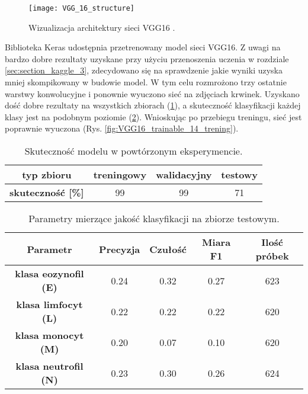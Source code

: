 \begin{figure}[h]
	\centering
	\centering
		\texttt{[image: VGG\_16\_structure]}	
	\caption{Wizualizacja architektury sieci VGG16 \cite{VGG_16_structure}.}
	\label{fig:vgg_16_stucture}
	\label{fig:ann_visualisation}
\end{figure}

{\parindent0pt
Biblioteka Keras udostępnia przetrenowany model sieci VGG16. Z uwagi na bardzo dobre rezultaty uzyskane przy użyciu przenoszenia uczenia w rozdziale \ref{sec:section_kaggle_3}, zdecydowano się na sprawdzenie jakie wyniki uzyska mniej skompikowany w budowie model. W tym celu rozmrożono trzy ostatnie warstwy konwolucyjne i ponownie wyuczono sieć na zdjęciach krwinek. Uzyskano dość dobre rezultaty na wszystkich zbiorach (\ref{tab:VGG16_acc}), a skuteczność klasyfikacji każdej klasy jest na podobnym poziomie (\ref{tab:VGG16_params_val}). Wnioskując po przebiegu treningu, sieć jest poprawnie wyuczona (Rys. \ref{fig:VGG16_trainable_14_trening}).

 \begin{table}[h!]
\centering
\caption[Short Heading]{Skuteczność modelu w powtórzonym eksperymencie.}
\label{tab:VGG16_acc}
\begin{tabular}{|c|c|c|c|}
\hline
\textbf{typ zbioru}           & \textbf{treningowy} & \textbf{walidacyjny} & \textbf{testowy} \\ \hline
\textbf{skuteczność {[}\%{]}} & 99                  & 99                   & 71               \\ \hline
\end{tabular}
\end{table}

\begin{table}[h!]
\centering
\caption[Short Heading]{Parametry mierzące jakość klasyfikacji na zbiorze testowym.}
\label{tab:VGG16_params_val}
\begin{tabular}{|c|c|c|c|c|}
\hline
\textbf{Parametr}                               & \textbf{Precyzja} & \textbf{Czułość} & \textbf{Miara F1} & \textbf{Ilość próbek} \\ \hline
\textbf{klasa eozynofil (E)} & 0.24   & 0.32   & 0.27 & 623  \\ \hline
\textbf{klasa limfocyt (L)} & 0.22  & 0.22 & 0.22  & 620  \\ \hline
\textbf{klasa monocyt (M)} & 0.20   & 0.07    & 0.10  & 620  \\ \hline
\textbf{klasa neutrofil (N)} & 0.23   & 0.30    & 0.26  & 624  \\ \hline
\end{tabular}
\end{table}

}

